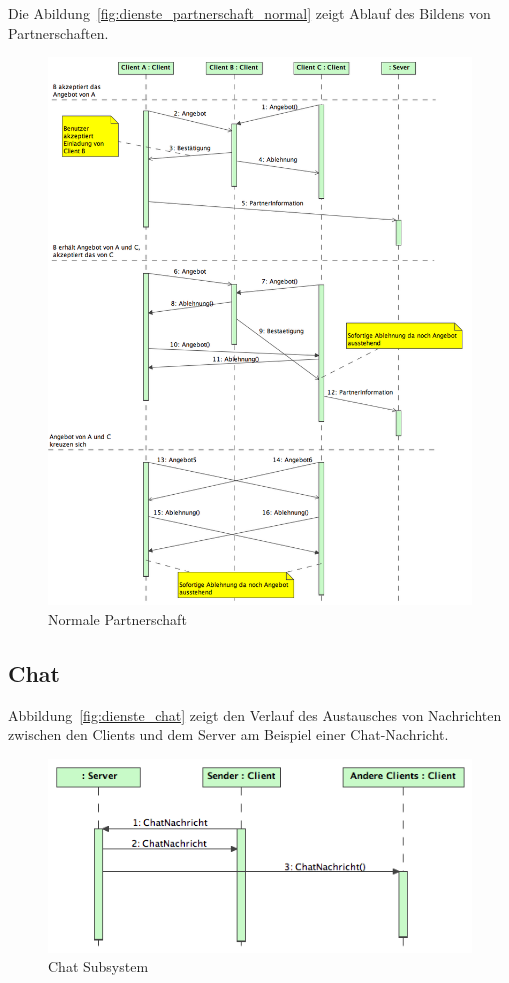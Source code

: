 \documentclass[12pt,halfparskip]{scrartcl}
\begin{document}
Die Abildung~\vref{fig:dienste_partnerschaft_normal} zeigt Ablauf des Bildens von Partnerschaften.
\begin{figure}[h]
	\centering
	\includegraphics[width=\textwidth]{dienste_partnerschaft_normal}
	\caption{Normale Partnerschaft}
	\label{fig:dienste_partnerschaft_normal}
\end{figure}

\clearpage
\subsection{Chat} %
\label{sub:nachrichtenaustausch_zwischen_client_und_server}
Abbildung~\vref{fig:dienste_chat} zeigt den Verlauf des Austausches von Nachrichten zwischen den Clients und dem Server am Beispiel einer Chat-Nachricht.
\begin{figure}[h]
	\centering
	\includegraphics[width=\textwidth]{dienste_chat}
	\caption{Chat Subsystem}
	\label{fig:dienste_chat}
\end{figure}
\clearpage
\end{document}

